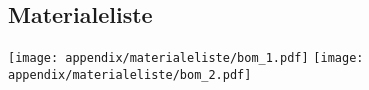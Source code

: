 \documentclass[12pt,a4paper,twoside]{article}
\begin{document}
    \subsection{Materialeliste} 
    \texttt{[image: appendix/materialeliste/bom\_1.pdf]}
    \newpage
    \texttt{[image: appendix/materialeliste/bom\_2.pdf]}
    
    
    
%    
\end{document}
